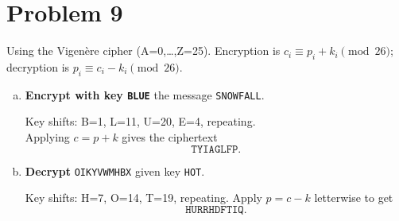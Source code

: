 \section*{Problem 9}

Using the Vigen\`ere cipher (A=0,\ldots,Z=25). Encryption is $c_i \equiv p_i + k_i \pmod{26}$; decryption is $p_i \equiv c_i - k_i \pmod{26}$.

\begin{enumerate}[(a)]
\item \textbf{Encrypt with key \texttt{BLUE}} the message \texttt{SNOWFALL}.

Key shifts: B=1, L=11, U=20, E=4, repeating.\\
Applying $c=p+k$ gives the ciphertext
\[
\boxed{\texttt{TYIAGLFP}}.
\]

\item \textbf{Decrypt} \texttt{OIKYVWMHBX} given key \texttt{HOT}.

Key shifts: H=7, O=14, T=19, repeating. Apply $p=c-k$ letterwise to get
\[
\boxed{\texttt{HURRHDFTIQ}}.
\]
\end{enumerate}
